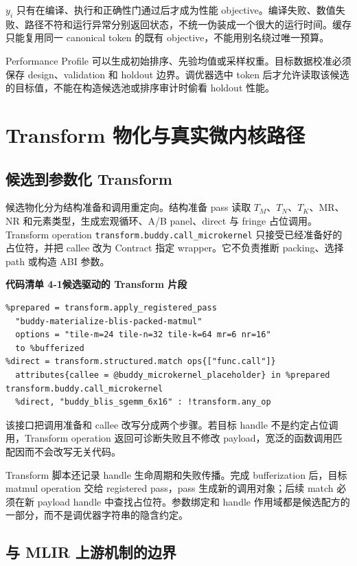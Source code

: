 $y_i$ 只有在编译、执行和正确性门通过后才成为性能 objective。编译失败、数值失败、路径不符和运行异常分别返回状态，不统一伪装成一个很大的运行时间。缓存只能复用同一 canonical token 的既有 objective，不能用别名绕过唯一预算。

Performance Profile 可以生成初始排序、先验均值或采样权重。目标数据校准必须保存 design、validation 和 holdout 边界。调优器选中 token 后才允许读取该候选的目标值，不能在构造候选池或排序审计时偷看 holdout 性能。

\section{Transform 物化与真实微内核路径}

\subsection{候选到参数化 Transform}

候选物化分为结构准备和调用重定向。结构准备 pass 读取 $T_M$、$T_N$、$T_K$、MR、NR 和元素类型，生成宏观循环、A/B panel、direct 与 fringe 占位调用。Transform operation \texttt{transform.buddy.call\_microkernel} 只接受已经准备好的占位符，并把 callee 改为 Contract 指定 wrapper。它不负责推断 packing、选择 path 或构造 ABI 参数。

\noindent\textbf{代码清单 4-1\quad 候选驱动的 Transform 片段}
\begin{verbatim}
%prepared = transform.apply_registered_pass
  "buddy-materialize-blis-packed-matmul"
  options = "tile-m=24 tile-n=32 tile-k=64 mr=6 nr=16"
  to %bufferized
%direct = transform.structured.match ops{["func.call"]}
  attributes{callee = @buddy_microkernel_placeholder} in %prepared
transform.buddy.call_microkernel
  %direct, "buddy_blis_sgemm_6x16" : !transform.any_op
\end{verbatim}

该接口把调用准备和 callee 改写分成两个步骤。若目标 handle 不是约定占位调用，Transform operation 返回可诊断失败且不修改 payload，宽泛的函数调用匹配因而不会改写无关代码。

Transform 脚本还记录 handle 生命周期和失败传播。完成 bufferization 后，目标 matmul operation 交给 registered pass，pass 生成新的调用对象；后续 match 必须在新 payload handle 中查找占位符。参数绑定和 handle 作用域都是候选配方的一部分，而不是调优器字符串的隐含约定。

\subsection{与 MLIR 上游机制的边界}

